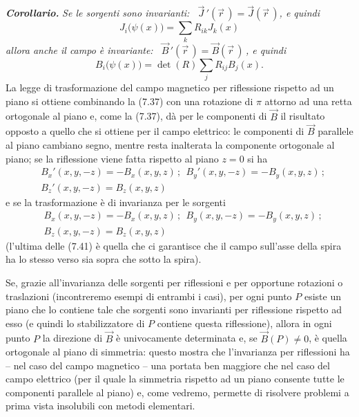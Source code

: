 \textbf{\textit{Corollario.}} \textit{Se le sorgenti sono invarianti:
\ $\vec J\,'(\vec r\,)=\vec J(\vec r\,)$, e quindi}
\begin{equation}
  J_i\big(\psi(x)\big)=\textstyle\sum_kR_{ik}J_k(x)
  \tag{7.38}
\end{equation}
\textit{allora anche il campo \`e invariante:
\ $\vec B\,'(\vec r\,)=\vec B(\vec r\,)$\,, e quindi}
\begin{equation}
  B_i\big(\psi(x)\big)=\det(R)\textstyle\sum_jR_{ij}B_j(x).
  \tag{7.39}
\end{equation}
La legge di trasformazione del campo magnetico per riflessione rispetto ad un
piano si ottiene combinando la (7.37) con una rotazione di $\pi$ attorno ad una
retta ortogonale al piano e, come la (7.37), d\`a per le componenti di $\vec B$
il risultato opposto a quello che si ottiene per il campo elettrico: le
componenti di $\vec B$ parallele al piano cambiano segno, mentre resta
inalterata la componente ortogonale al piano; se la riflessione viene fatta
rispetto al piano $z=0$ si ha
\begin{equation}
  \begin{aligned}
    &B_x'(x,y,-z)=-B_x(x,y,z)\,;\ \ B_y'(x,y,-z)=-B_y(x,y,z)\,;\\
    &B_z'(x,y,-z)=B_z(x,y,z)
  \end{aligned}
  \tag{7.40}
\end{equation}
e se la trasformazione \`e di invarianza per le sorgenti
\begin{equation}
  \begin{aligned}
    &B_x(x,y,-z)=-B_x(x,y,z)\,;\ \ B_y(x,y,-z)=-B_y(x,y,z)\,;\\
    &B_z(x,y,-z)=B_z(x,y,z)
  \end{aligned}
  \tag{7.41}
\end{equation}
(l'ultima delle (7.41) \`e quella che ci garantisce che il campo sull'asse della
spira ha lo stesso verso sia sopra che sotto la spira).

Se, grazie all'invarianza delle sorgenti per riflessioni e per opportune
rotazioni o traslazioni (incontreremo esempi di entrambi i casi), per ogni punto
$P$ esiste un piano che lo contiene tale che sorgenti sono invarianti per
riflessione rispetto ad esso (e quindi lo stabilizzatore di $P$ contiene questa
riflessione), allora in ogni punto $P$ la direzione di $\vec B$ \`e univocamente
determinata e, se $\vec B(P)\ne0$, \`e quella ortogonale al piano di simmetria:
questo mostra che l'invarianza per riflessioni ha -- nel caso del campo
magnetico -- una portata ben maggiore che nel caso del campo elettrico (per il
quale la simmetria rispetto ad un piano consente tutte le componenti parallele
al piano) e, come vedremo, permette di risolvere problemi a prima vista
insolubili con metodi elementari.

